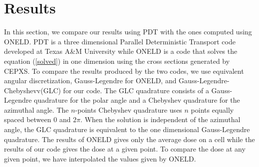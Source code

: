 \section{Results}
In this section, we compare our results using PDT with the ones computed using
ONELD\cite{cepxs}. PDT is a three dimensional Parallel Deterministic Transport code developed at
Texas A\&M University while ONELD is a code that solves the  
equation (\ref{solved}) in one dimension using the cross sections generated by CEPXS. 
To compare the results produced by the two codes, we use equivalent angular 
discretization, Gauss-Legendre for ONELD, and Gauss-Legendre-Chebyshevv(GLC) for our
code. The GLC quadrature consists of a Gauss-Legendre
quadrature for the polar angle and a Chebyshev quadrature for the azimuthal
angle. The $n$-points Chebyshev quadrature uses $n$ points equally spaced
between 0 and $2\pi$. When the solution is independent of the azimuthal angle,
the GLC quadrature is equivalent to the one dimensional Gauss-Legendre
quadrature. The results of ONELD gives only the average dose on a cell while
the results of our code gives the dose at a given point. To compare the dose
at any given point, we have interpolated the values given by ONELD.


